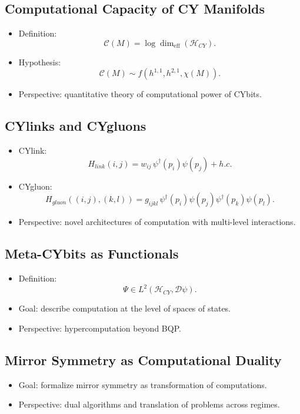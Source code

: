 \documentclass[12pt,a4paper]{article}
\begin{document}
\subsection{Computational Capacity of CY Manifolds}
\begin{itemize}
\item Definition:
\[
\mathcal{C}(M) = \log \dim_{\mathrm{eff}}(\mathcal{H}_{CY}).
\]
\item Hypothesis:
\[
\mathcal{C}(M) \sim f(h^{1,1}, h^{2,1}, \chi(M)).
\]
\item Perspective: quantitative theory of computational power of CYbits.  
\end{itemize}

\subsection{CYlinks and CYgluons}
\begin{itemize}
\item CYlink:
\[
H_{link}(i,j) = w_{ij}\,\psi^\dagger(p_i)\psi(p_j) + h.c.
\]
\item CYgluon:
\[
H_{gluon}((i,j),(k,l)) = g_{ijkl}\,\psi^\dagger(p_i)\psi(p_j)\psi^\dagger(p_k)\psi(p_l).
\]
\item Perspective: novel architectures of computation with multi-level interactions.  
\end{itemize}

\subsection{Meta-CYbits as Functionals}
\begin{itemize}
\item Definition:
\[
\Psi \in L^2(\mathcal{H}_{CY}, \mathcal{D}\psi).
\]
\item Goal: describe computation at the level of spaces of states.  
\item Perspective: hypercomputation beyond BQP.  
\end{itemize}

\subsection{Mirror Symmetry as Computational Duality}
\begin{itemize}
\item Goal: formalize mirror symmetry as transformation of computations.  
\item Perspective: dual algorithms and translation of problems across regimes.  
\end{itemize}
\end{document}
